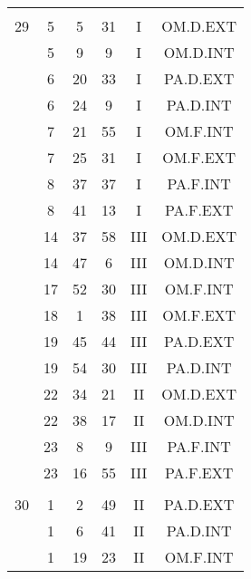 \documentclass[12pt, a4paper]{article}
\begin{document}
\begin{multicols}{3}
{\begin{tabular}{c c c c c c}
	 	 	 	 & & & & & \\%
	 	 	 	29 & 5 & 5 & 31 & I & OM.D.EXT\\%
	 	 	 	 & 5 & 9 & 9 & I & OM.D.INT\\%
	 	 	 	 & 6 & 20 & 33 & I & PA.D.EXT\\%
	 	 	 	 & 6 & 24 & 9 & I & PA.D.INT\\%
	 	 	 	 & 7 & 21 & 55 & I & OM.F.INT\\%
	 	 	 	 & 7 & 25 & 31 & I & OM.F.EXT\\%
	 	 	 	 & 8 & 37 & 37 & I & PA.F.INT\\%
	 	 	 	 & 8 & 41 & 13 & I & PA.F.EXT\\%
	 	 	 	 & 14 & 37 & 58 & III & OM.D.EXT\\%
	 	 	 	 & 14 & 47 & 6 & III & OM.D.INT\\%
	 	 	 	 & 17 & 52 & 30 & III & OM.F.INT\\%
	 	 	 	 & 18 & 1 & 38 & III & OM.F.EXT\\%
	 	 	 	 & 19 & 45 & 44 & III & PA.D.EXT\\%
	 	 	 	 & 19 & 54 & 30 & III & PA.D.INT\\%
	 	 	 	 & 22 & 34 & 21 & II & OM.D.EXT\\%
	 	 	 	 & 22 & 38 & 17 & II & OM.D.INT\\%
	 	 	 	 & 23 & 8 & 9 & III & PA.F.INT\\%
	 	 	 	 & 23 & 16 & 55 & III & PA.F.EXT\\%
	 	 	 	 & & & & & \\%
	 	 	 	30 & 1 & 2 & 49 & II & PA.D.EXT\\%
	 	 	 	 & 1 & 6 & 41 & II & PA.D.INT\\%
	 	 	 	 & 1 & 19 & 23 & II & OM.F.INT\\%

\end{tabular}}
\end{multicols}
\end{document}
